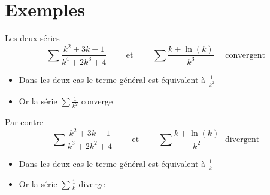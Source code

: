 \section{Exemples}

\begin{frame}
\begin{exemple}
Les deux séries 
$$
\sum \frac{k^2+3k+1}{k^4+2k^3+4}
\qquad \text{ et } \qquad 
\sum \frac{k +\ln(k)}{k^3}
\quad \text{ convergent}
$$
\vspace{-.3cm}
\begin{itemize}
\item\pause Dans les deux cas le terme général est équivalent à $\frac{1}{k^2}$
\item\pause Or la série $\sum \frac{1}{k^2}$ converge
\end{itemize}
\end{exemple}

\pause
\begin{exemple}
Par contre
$$
\sum \frac{k^2+3k+1}{k^3+2k^2+4}
\qquad \text{ et } \qquad 
\sum \frac{k +\ln(k)}{k^2}
\;\mbox{ divergent}
$$
\vspace{-.3cm}
\begin{itemize}
\item\pause Dans les deux cas le terme général est équivalent à $\frac{1}{k}$
\item\pause Or la série $\sum \frac{1}{k}$ diverge
\end{itemize}\end{exemple}

\end{frame}

